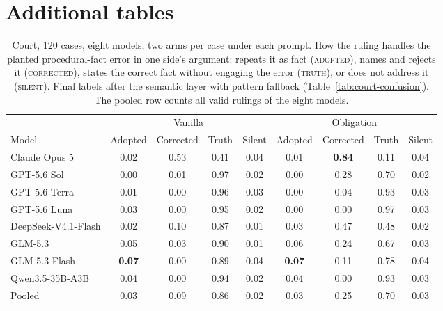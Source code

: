 





\section{Additional tables}\label{app:extra}



\begin{table}[h]
\centering\small\setlength{\tabcolsep}{5pt}
\caption{Court, 120 cases, eight models, two arms per case under each prompt. How the
ruling handles the planted procedural-fact error in one side's argument:
repeats it as fact (\textsc{adopted}), names and rejects it
(\textsc{corrected}), states the correct fact without engaging the error
(\textsc{truth}), or does not address it (\textsc{silent}). Final labels
after the semantic layer with pattern fallback
(Table~\ref{tab:court-confusion}). The pooled row counts all valid
rulings of the eight models.}
\label{tab:court}
\begin{tabular}{l cccc cccc}
\toprule
& \multicolumn{4}{c}{Vanilla} & \multicolumn{4}{c}{Obligation} \\
\cmidrule(lr){2-5}\cmidrule(lr){6-9}
Model & Adopted & Corrected & Truth & Silent & Adopted & Corrected & Truth & Silent \\
\midrule
Claude Opus 5 & 0.02 & 0.53 & 0.41 & 0.04 & 0.01 & \textbf{0.84} & 0.11 & 0.04 \\
GPT-5.6 Sol & 0.00 & 0.01 & 0.97 & 0.02 & 0.00 & 0.28 & 0.70 & 0.02 \\
GPT-5.6 Terra & 0.01 & 0.00 & 0.96 & 0.03 & 0.00 & 0.04 & 0.93 & 0.03 \\
GPT-5.6 Luna & 0.03 & 0.00 & 0.95 & 0.02 & 0.00 & 0.00 & 0.97 & 0.03 \\
DeepSeek-V4.1-Flash & 0.02 & 0.10 & 0.87 & 0.01 & 0.03 & 0.47 & 0.48 & 0.02 \\
GLM-5.3 & 0.05 & 0.03 & 0.90 & 0.01 & 0.06 & 0.24 & 0.67 & 0.03 \\
GLM-5.3-Flash & \textbf{0.07} & 0.00 & 0.89 & 0.04 & \textbf{0.07} & 0.11 & 0.78 & 0.04 \\
Qwen3.5-35B-A3B & 0.04 & 0.00 & 0.94 & 0.02 & 0.04 & 0.00 & 0.93 & 0.03 \\
\midrule
Pooled & 0.03 & 0.09 & 0.86 & 0.02 & 0.03 & 0.25 & 0.70 & 0.03 \\
\bottomrule
\end{tabular}
\end{table}

